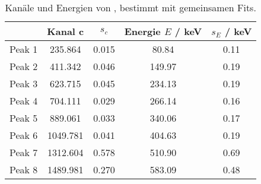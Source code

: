 \begin{table}[H]
\caption{Kan\"ale und Energien von \th, bestimmt mit gemeinsamen Fits.}
\begin{center}
\begin{tabular}{|c|c|c|c|c|}
  \hline
   & Kanal c & $s_c$ & Energie $E$ / keV & $s_E$ / keV \\ \hline
  Peak 1 & 235.864 & 0.015 & 80.84 & 0.11 \\ \hline
  Peak 2 & 411.342 & 0.046 & 149.97 & 0.19 \\ \hline
  Peak 3 & 623.715 & 0.045 & 234.13 & 0.19 \\ \hline
  Peak 4 & 704.111 & 0.029 & 266.14 & 0.16 \\ \hline
  Peak 5 & 889.061 & 0.033 & 340.06 & 0.17 \\ \hline
  Peak 6 & 1049.781 & 0.041 & 404.63 & 0.19 \\ \hline
  Peak 7 & 1312.604 & 0.578 & 510.90 & 0.69 \\ \hline
  Peak 8 & 1489.981 & 0.270 & 583.09 & 0.48 \\ \hline
\end{tabular}
\end{center}
\label{tab:th:multi}
\end{table}
